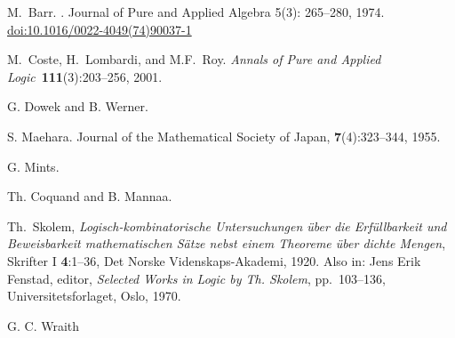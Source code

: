 \documentclass[10pt,a4paper]{article}
\begin{document}
\begin{thebibliography}{9}

 M.~Barr.
.
Journal of Pure and Applied Algebra 5(3): 265--280, 1974.
\url{doi:10.1016/0022-4049(74)90037-1}

 M.~Coste, H.~Lombardi, and M.F.~Roy.
\newblock\emph{Annals of Pure and Applied Logic}~\textbf{111}(3):203--256, 2001.

G. Dowek and B. Werner.


S. Maehara.
Journal of the Mathematical Society of Japan, \textbf{7}(4):323--344, 1955.

G. Mints.

Th. Coquand and B. Mannaa.

Th.~Skolem,
\newblock\emph{Logisch-kombinatorische Untersuchungen \"{u}ber
die Erf\"{u}llbarkeit %
und Beweisbarkeit mathematischen S\"{a}tze
nebst einem Theoreme \"{u}ber dichte Mengen},
{Skrifter} I \textbf{4}:1--36, Det Norske Videnskaps-Akademi, 1920.
\newblock Also in: Jens Erik Fenstad, editor,
\emph{Selected Works in Logic by Th. Skolem}, pp.~103--136,
Universitetsforlaget, Oslo, 1970.

G. C. Wraith

\end{thebibliography}
\end{document}
